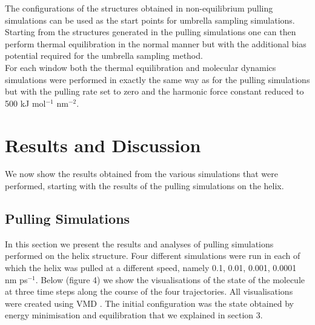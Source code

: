 \documentclass[12pt, onecolumn]{revtex4}    %
\begin{document}
The configurations of the structures obtained in non-equilibrium pulling simulations can be used as the start points for umbrella sampling simulations.  Starting from the structures generated in the pulling simulations one can then perform thermal equilibration in the normal manner but with the additional bias potential required for the umbrella sampling method\cite{GMX}.\\

For each window both the thermal equilibration and molecular dynamics simulations were performed in exactly the same way as for the pulling simulations but with the pulling rate set to zero and the harmonic force constant reduced to 500 kJ mol$^{-1}$ nm$^{-2}$. 

\section{Results and Discussion}

We now show the results obtained from the various simulations that were performed, starting with the results of the pulling simulations on the helix.  

\subsection{Pulling Simulations}

In this section we present the results and analyses of pulling simulations performed on the helix structure.  Four different simulations were run in each of which the helix was pulled at a different speed, namely 0.1, 0.01, 0.001, 0.0001 nm ps$^{-1}$.  Below (figure 4) we show the visualisations of the state of the molecule at three time steps along the course of the four trajectories.  All visualisations were created using VMD \cite{VMD}.  The initial configuration was the state obtained by energy minimisation and equilibration that we explained in section 3.\\
\end{document}
